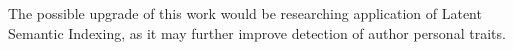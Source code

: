 \documentclass[10pt, a4paper]{article}
\begin{document}
The possible upgrade of this work would be researching application of Latent Semantic Indexing, as it may further improve detection of author personal traits.

%
%
%
%
%
%
%
%
%
%
\end{document}
